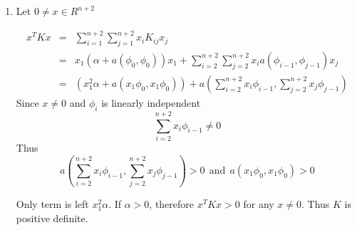{\begin{solution}
\begin{enumerate}
\[
a(u_N, v)= \alpha c_0 +  \sum_{j=0}^{N+1} a(\phi_i, \phi_j) c_j , \quad (f, \phi_i)= \int_0^1 f(x) \phi_i(x) \, dx, \quad \mbox{for} \:\:\: i=0, 1, \cdots N+1
\]

Where $K_{ij}= a(\phi_i, \phi_j) $. However we should be careful at this point. Because of new boundary conditions bilinear form includes the term $\alpha c_0 $. When we construct our stiffness matrix $K$ because of the coefficient $c_0$, the matrix entry $K_{11}$ will be
\[
K_{11}= \alpha + a(\phi_{0}, \phi_{0})= \alpha + \int_0^1 \pd{\phi_{0}}{x}{} \pd{\phi_{0}}{x}{} \, dx = \alpha + \frac{1}{h}
\]

By part (b) we know that $K_{ii} = \frac{2}{h}$ and $K_{i{(i+1)}}= K_{{(i+1)}i} = \frac{-1}{h} $ for $i= 2,\cdots N+1$. Also for $i=N+2$
\[
K_{{(N+2)}{(N+2)}} = a(\phi_{N+1}, \phi_{N+1}) = \int_0^1 \pd{\phi_{N+1}}{x}{} \pd{\phi_{N+1}}{x}{} \, dx = \frac{1}{h}
\]

Therefore

\[
K= \frac{1}{h}\left[\begin{array}{rrrrrrr}
              \alpha h + 1 & -1 & 0 & 0 &  \cdots & 0 \\[0.25em]
               -1 & 2 & -1 &0 & \cdots & 0 \\
                0& -1 & 2 & -1 & \cdots & 0\\
                 \vdots & & &\ddots &  & \vdots \\[0.25em]
                 0 & \cdots &  & -1& 2 & -1 \\ 
                 0 & &\cdots &  & -1 & 1 
                   \end{array}\right]
                   \]

Finally, the right hand side vector $b_i$ 
\[
b_i = (f,\phi_{i-1})= \int_{0}^{1} f(x) \phi_{i-1} (x) \, dx  \:\:\: \mbox{if} \:\: i= 1,\cdots, N+2\\
\]


\item Let $0 \neq x \in R^{n+2}$ 

\begin{eqnarray*}
x^T K x&=& \sum_{i=1}^{n+2} \sum_{j=1}^{n+2} x_i K_{ij}  x_j\\
			 &=& x_1 ( \alpha + a( \phi_0, \phi_0)) x_1 + \sum_{i=2}^{n+2} \sum_{j=2}^{n+2}  x_i a( \phi_{i-1}, \phi_{j-1}) x_j \\
			 &=&  (x_1^2 \alpha + a(x_1 \phi_0, x_1\phi_0))+  a( \sum_{i=2}^{n+2} x_i\phi_{i-1}, \sum_{j=2}^{n+2} x_{j} \phi_{j-1})
\end{eqnarray*}
Since $x\neq 0 $ and $\phi_i$ is linearly independent 
\[
\sum_{i=2}^{n+2} x_i \phi_{i-1} \neq 0
\] 
Thus
 \[
 a( \sum_{i=2}^{n+2} x_i\phi_{i-1}, \sum_{j=2}^{n+2} x_j\phi_{j-1}) > 0 \:\: \mbox{and} \:\:a(x_1 \phi_0, x_1\phi_0) > 0 
 \]
 
 Only term is left $ x_1^2 \alpha$. If $\alpha>0$, therefore $ x^T K x >0 $ for any $x\neq 0 $. Thus $K$  is positive definite.


\end{enumerate}
\end{solution}
}{}
